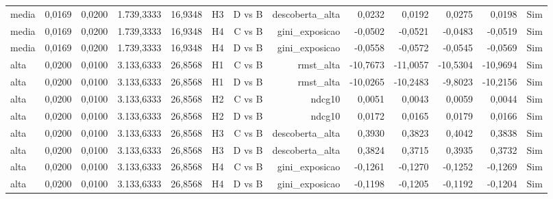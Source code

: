 \begin{table}[ht]
\begin{tabular}{lrrrrrrrrrrrr}
media & 0,0169 & 0,0200 & 1.739,3333 & 16,9348 & H3 & D vs B & descoberta\_alta & 0,0232 & 0,0192 & 0,0275 & 0,0198 & Sim \\
media & 0,0169 & 0,0200 & 1.739,3333 & 16,9348 & H4 & C vs B & gini\_exposicao & -0,0502 & -0,0521 & -0,0483 & -0,0519 & Sim \\
media & 0,0169 & 0,0200 & 1.739,3333 & 16,9348 & H4 & D vs B & gini\_exposicao & -0,0558 & -0,0572 & -0,0545 & -0,0569 & Sim \\
alta & 0,0200 & 0,0100 & 3.133,6333 & 26,8568 & H1 & C vs B & rmst\_alta & -10,7673 & -11,0057 & -10,5304 & -10,9694 & Sim \\
alta & 0,0200 & 0,0100 & 3.133,6333 & 26,8568 & H1 & D vs B & rmst\_alta & -10,0265 & -10,2483 & -9,8023 & -10,2156 & Sim \\
alta & 0,0200 & 0,0100 & 3.133,6333 & 26,8568 & H2 & C vs B & ndcg10 & 0,0051 & 0,0043 & 0,0059 & 0,0044 & Sim \\
alta & 0,0200 & 0,0100 & 3.133,6333 & 26,8568 & H2 & D vs B & ndcg10 & 0,0172 & 0,0165 & 0,0179 & 0,0166 & Sim \\
alta & 0,0200 & 0,0100 & 3.133,6333 & 26,8568 & H3 & C vs B & descoberta\_alta & 0,3930 & 0,3823 & 0,4042 & 0,3838 & Sim \\
alta & 0,0200 & 0,0100 & 3.133,6333 & 26,8568 & H3 & D vs B & descoberta\_alta & 0,3824 & 0,3715 & 0,3935 & 0,3732 & Sim \\
alta & 0,0200 & 0,0100 & 3.133,6333 & 26,8568 & H4 & C vs B & gini\_exposicao & -0,1261 & -0,1270 & -0,1252 & -0,1269 & Sim \\
alta & 0,0200 & 0,0100 & 3.133,6333 & 26,8568 & H4 & D vs B & gini\_exposicao & -0,1198 & -0,1205 & -0,1192 & -0,1204 & Sim \\
\hline
\end{tabular}
\end{table}
